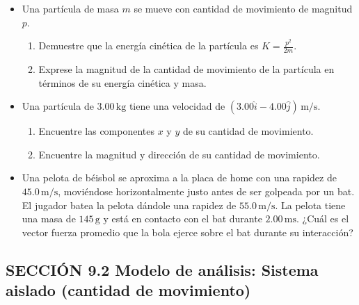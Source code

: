 \documentclass[11pt,a4paper]{article}
\begin{document}
\begin{itemize}
    \item[\textbf{1.}] Una partícula de masa \(m\) se mueve con cantidad de movimiento de magnitud \(p\).
    \begin{enumerate}
        \item Demuestre que la energía cinética de la partícula es \(K = \frac{p^2}{2m}\).
        \item Exprese la magnitud de la cantidad de movimiento de la partícula en términos de su energía cinética y masa.
    \end{enumerate}
    \vspace*{6cm}

    \item[\textbf{2.}] Una partícula de \(3.00\,\text{kg}\) tiene una velocidad de \((3.00\hat{i} - 4.00\hat{j})\,\text{m/s}\).
    \begin{enumerate}
        \item Encuentre las componentes \(x\) y \(y\) de su cantidad de movimiento.
        \item Encuentre la magnitud y dirección de su cantidad de movimiento.
    \end{enumerate}
    \vspace*{6cm}

    \item[\textbf{3.}] Una pelota de béisbol se aproxima a la placa de home con una rapidez de \(45.0\,\text{m/s}\), moviéndose horizontalmente justo antes de ser golpeada por un bat. El jugador batea la pelota dándole una rapidez de \(55.0\,\text{m/s}\). La pelota tiene una masa de \(145\,\text{g}\) y está en contacto con el bat durante \(2.00\,\text{ms}\). ¿Cuál es el vector fuerza promedio que la bola ejerce sobre el bat durante su interacción?
    \vspace*{6cm}
\end{itemize}

\newpage

\subsection*{SECCIÓN 9.2 Modelo de análisis: Sistema aislado (cantidad de movimiento)}
\end{document}
